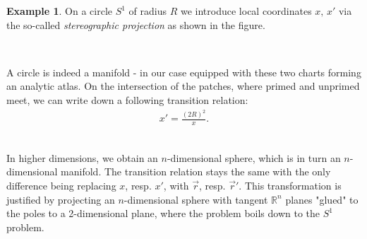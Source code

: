 \documentclass[a4paper,11pt]{article}
\theoremstyle{theorem}
\theoremstyle{remark}
\theoremstyle{definition}
\newtheorem*{example}{Example}
\begin{document}
		\begin{example}
			On a circle $S^1$ of radius $R$ we introduce local coordinates $x, \, x'$ via the so-called \emph{stereographic projection} as shown in the figure.
			
			\begin{minipage}{0.45\textwidth}
			\end{minipage}
			~
			\begin{minipage}{0.45\textwidth}
				A circle is indeed a manifold - in our case equipped with these two charts forming an analytic atlas. On the intersection of the patches, where primed and unprimed meet, we can write down a following transition relation:
				\begin{align*}
					x' = \frac{(2R)^2}{x}.
				\end{align*}
			\end{minipage}\\
			In higher dimensions, we obtain an $n$-dimensional sphere, which is in turn an $n$-dimensional manifold. The transition relation stays the same with the only difference being replacing $x$, resp. $x'$, with $\vec r$, resp. $\vec r'$. This transformation is justified by projecting an $n$-dimensional sphere with tangent $\mathbb R^n$ planes "glued" to the poles to a 2-dimensional plane, where the problem boils down to the $S^1$ problem.
		\end{example}
		
\end{document}
